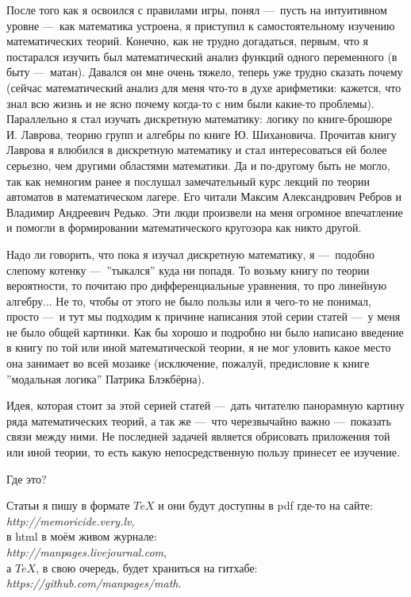\documentclass[math.tex]{subfiles}
\begin{document}
	После того как я освоился с правилами игры, понял —\ пусть на интуитивном уровне —\ как математика устроена, я приступил к самостоятельному изучению математических теорий. 
Конечно, как не трудно до\-гадаться, первым, что я по\-старался изучить был математический анализ функций одного
переменного (в быту —\ матан). 
Давался он мне очень тяжело, теперь уже трудно сказать почему (сейчас математический анализ для меня что-то в духе арифметики: кажется, что знал всю жизнь и не ясно почему когда-то с ним были какие-то проблемы). 
Параллельно я стал изучать дискретную математику: логику по книге-брошюре И. Лаврова, теорию групп и алгебры по книге Ю. Шихановича.
Прочитав книгу Лаврова я влюбился в дискретную математику и стал интересоваться ей более серьезно, чем другими областями математики. 
Да и по-другому быть не могло, так как немногим ранее я послушал замечательный курс лекций по теории автоматов в ма\-те\-ма\-ти\-ческом лагере. 
Его читали Максим Александрович Ребров и Владимир Андреевич Редько. 
Эти люди произвели на меня огромное впечатление и помогли в фор\-мир\-овании математического кругозора как никто другой.
	
	Надо ли говорить, что пока я изучал дискретную математику, я —\ подобно слепому котенку —\ ''тыкался'' куда ни попадя. То возьму книгу по теории вер\-оятности, то почитаю про дифференциальные уравнения, то про линейную алгебру... 
Не то, чтобы от этого не было пользы или я чего-то не понимал, просто —\ и тут мы подходим к причине написания этой серии статей —\ у меня не было общей картинки. 
Как бы хорошо и подробно ни было написано введение в книгу по той или иной математической теории, я не мог уловить какое место она занимает во всей мозаике (исключение, пожалуй, предисловие к книге ''модальная логика'' Патрика Блэкбёрна).
	
	Идея, которая стоит за этой серией статей —\ дать читателю панорамную картину ряда математических теорий, а так же —\ что черезвычайно важно —\ показать связи между ними.
	Не последней задачей является обрисовать приложения той или иной теории, то есть какую непосредственную пользу принесет ее изучение.

	\vspace{1cm}
	\LARGE{Где это?}\\
	\normalsize
	
	Статьи я пишу в формате $TeX$ и они будут доступны в pdf где-то на сайте:\\ 
	\emph{http://memoricide.very.lv},\\ 
	в html в моём живом журнале:
	\\ \emph{http://manpages.livejournal.com},\\ 
	а $TeX$, в свою очередь, будет храниться на гитхабе:\\ 
	\emph{https://github.com/manpages/math}.
	
\end{document}
